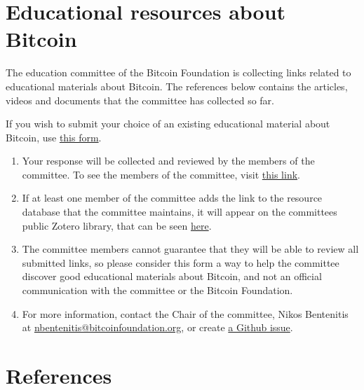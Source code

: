 \documentclass{article}
\begin{document}
\section*{Educational resources about Bitcoin}

The education committee of the Bitcoin Foundation is collecting links related to educational materials about Bitcoin. The references below contains the articles, videos and documents that the committee has collected so far.

If you wish to submit your choice of an existing educational material about Bitcoin, use \href{https://docs.google.com/forms/d/1bDA-s3yfhkxfHkz_F426Gov6xpdEfSJzmYN0unyO9bs/viewform}{this form}. 

\begin{enumerate}
\item Your response will be collected and reviewed by the members of the committee. To see the members of the committee, visit \href{https://github.com/btcfoundationedcom/btcfoundationedcom.github.io/graphs/contributors}{this link}.
\item If at least one member of the committee adds the link to the resource database that the committee maintains, it will appear on the committees public Zotero library, that can be seen \href{https://www.zotero.org/groups/bfeducomm/items/}{here}.
\item The committee members cannot guarantee that they will be able to review all submitted links, so please consider this form a way to help the committee discover good educational materials about Bitcoin, and not an official communication with the committee or the Bitcoin Foundation.
\item For more information, contact the Chair of the committee, Nikos Bentenitis at \url{nbentenitis@bitcoinfoundation.org}, or create \href{https://github.com/btcfoundationedcom/btcfoundationedcom.github.io/issues/new}{a Github issue}.

\end{enumerate}

\section*{References}

\nocite{*}
\printbibliography
\end{document}
